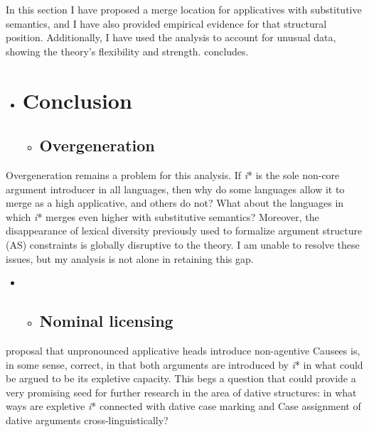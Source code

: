 \documentclass[output=paper,modfonts,nonflat]{langsci/langscibook}
\begin{document}
In this section I have proposed a merge location for applicatives with substitutive semantics, and I have also provided empirical evidence for that structural position. Additionally, I have used the analysis to account for unusual data, showing the theory’s flexibility and strength.  concludes. 

\begin{itemize}
\item \section{Conclusion}

\begin{itemize}
\item \subsection{Overgeneration}
\end{itemize}
\end{itemize}

Overgeneration remains a problem for this analysis. If \textit{i}* is the sole non-core argument introducer in all languages, then why do some languages allow it to merge as a high applicative, and others do not? What about the languages in which \textit{i}* merges even higher with substitutive semantics? Moreover, the disappearance of lexical diversity previously used to formalize argument structure (AS) constraints is globally disruptive to the theory. I am unable to resolve these issues, but my analysis is not alone in retaining this gap.

\begin{itemize}
\item \begin{itemize}
\item \subsection{Nominal licensing}
\end{itemize}
\end{itemize}

 proposal that unpronounced applicative heads introduce non-agentive Causees is, in some sense, correct, in that both arguments are introduced by \textit{i}* in what could be argued to be its expletive capacity. This begs a question that could provide a very promising seed for further research in the area of dative structures: in what ways are expletive \textit{i}* connected with dative case marking and Case assignment of dative arguments cross-linguistically? 
\end{document}
